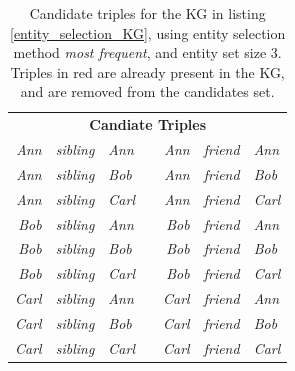 \begin{table}[htbp]
\centering
\begin{tabular}{rcllrcl}
\multicolumn{7}{c}{\textbf{Candiate Triples}}                                                                                                                                                                                                       \\
\textit{Ann}                        & \textit{sibling}                        & \textit{Ann}                        &  & \textit{Ann}                        & \textit{friend}                        & \textit{Ann}                        \\
{\color[HTML]{CB0000} \textit{Ann}} & {\color[HTML]{CB0000} \textit{sibling}} & {\color[HTML]{CB0000} \textit{Bob}}   &  & \textit{Ann}                        & \textit{friend}                        & \textit{Bob}                          \\
{\color[HTML]{CB0000} \textit{Ann}} & {\color[HTML]{CB0000} \textit{sibling}} & {\color[HTML]{CB0000} \textit{Carl}} &  & {\color[HTML]{CB0000} \textit{Ann}} & {\color[HTML]{CB0000} \textit{friend}} & {\color[HTML]{CB0000} \textit{Carl}} \\
\textit{Bob}                          & \textit{sibling}                        & \textit{Ann}                        &  & \textit{Bob}                          & \textit{friend}                        & \textit{Ann}                        \\
\textit{Bob}                          & \textit{sibling}                        & \textit{Bob}                          &  & \textit{Bob}                          & \textit{friend}                        & \textit{Bob}                          \\
\textit{Bob}                          & \textit{sibling}                        & \textit{Carl}                        &  & {\color[HTML]{CB0000} \textit{Bob}}   & {\color[HTML]{CB0000} \textit{friend}} & {\color[HTML]{CB0000} \textit{Carl}} \\
\textit{Carl}                        & \textit{sibling}                        & \textit{Ann}                        &  & \textit{Carl}                        & \textit{friend}                        & \textit{Ann}                        \\
\textit{Carl}                        & \textit{sibling}                        & \textit{Bob}                          &  & \textit{Carl}                        & \textit{friend}                        & \textit{Bob}                          \\
\textit{Carl}                        & \textit{sibling}                        & \textit{Carl}                        &  & \textit{Carl}                        & \textit{friend}                        & \textit{Carl}                       
\end{tabular}
\caption[Candidate triples for example KG]{Candidate triples for the KG in listing \ref{entity_selection_KG}, using entity selection method \textit{most frequent}, and entity set size 3. Triples in red are already present in the KG, and are removed from the candidates set.}
\label{canidate_triples_most_frequent}
\end{table}


